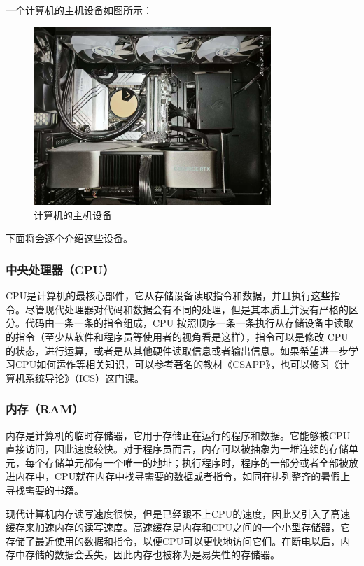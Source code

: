 \documentclass[../main.tex]{subfiles}
\begin{document}
一个计算机的主机设备如图所示：
\begin{figure}[htbp]
    \centering
    \includegraphics[width=0.8\textwidth]{images/hardware1.jpg}
    \caption{计算机的主机设备}
    \label{fig:computer-hardware}
\end{figure}

下面将会逐个介绍这些设备。

\subsubsection{中央处理器（CPU）}

CPU是计算机的最核心部件，它从存储设备读取指令和数据，并且执行这些指令。尽管现代处理器对代码和数据会有不同的处理，但是其本质上并没有严格的区分。代码由一条一条的指令组成，CPU 按照顺序一条一条执行从存储设备中读取的指令（至少从软件和程序员等使用者的视角看是这样），指令可以是修改 CPU 的状态，进行运算，或者是从其他硬件读取信息或者输出信息。如果希望进一步学习CPU如何运作等相关知识，可以参考著名的教材《CSAPP》，也可以修习《计算机系统导论》（ICS）这门课。

\subsubsection{内存（RAM）}

内存是计算机的临时存储器，它用于存储正在运行的程序和数据。它能够被CPU直接访问，因此速度较快。对于程序员而言，内存可以被抽象为一堆连续的存储单元，每个存储单元都有一个唯一的地址；执行程序时，程序的一部分或者全部被放进内存中，CPU就在内存中找寻需要的数据或者指令，如同在排列整齐的暑假上寻找需要的书籍。

现代计算机内存读写速度很快，但是已经跟不上CPU的速度，因此又引入了高速缓存来加速内存的读写速度。高速缓存是内存和CPU之间的一个小型存储器，它存储了最近使用的数据和指令，以便CPU可以更快地访问它们。在断电以后，内存中存储的数据会丢失，因此内存也被称为是易失性的存储器。
\end{document}
